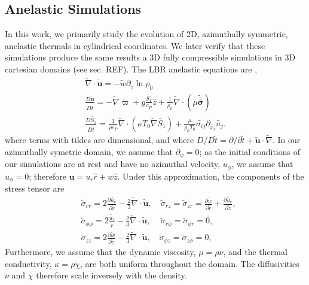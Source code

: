 \documentclass[twocolumn, amsmath, amsfonts, amssymb, trackchanges]{aastex62}
\newcommand{\td}[1]{\ensuremath{\widetilde{#1}}}
\newcommand{\grad}{\ensuremath{\nabla}}
\newcommand{\lilstressT}{\ensuremath{\bm{\bar{\bar{\sigma}}}}}
\begin{document}
\subsection{Anelastic Simulations}
In this work, we primarily study the evolution of 2D, azimuthally symmetric, anelastic
thermals in cylindrical coordinates. 
We later verify that these simulations produce the same results a 3D fully compressible
simulations in 3D cartesian domains (see sec. REF). 
The LBR anelastic equations are \citep{lecoanet&all2014},
\begin{gather}
\td{\grad}\cdot\td{\bm{u}} = -\td{w}\partial_{\tilde{z}} \ln\rho_0 
\label{eqn:AN_continuity_full}\\
\frac{D \td{\bm{u}}}{D \td{t}} = -\td{\grad} \td{\varpi} + g\frac{\td{S_1}}{c_P}\hat{z} + \frac{1}{\rho_0}\td{\grad}\cdot\left(\mu\td{\lilstressT}\right)
\label{eqn:AN_momentum_full}\\
\frac{D \td{S_1}}{D\td{t}} = \frac{1}{\rho c_P}\td{\grad}\cdot\left(\kappa T_0 \td{\grad} \td{S_1}\right) + \frac{\mu}{\rho_0 T_0}\td{\sigma_{ij}}\partial_{\td{x_i}}\td{u_j}
\label{eqn:AN_energy_full}.
\end{gather}
where terms with tildes are dimensional, and where
$D/D\td{t} = \partial/\partial \td{t} + \td{\bm{u}}\cdot\td{\grad}$. In our azimuthally symetric
domain, we assume that $\partial_\phi = 0$; as the initial conditions of our simulations are at rest and have
no azimuthal velocity, $u_\phi$, we assume that $u_\phi = 0$; therefore $\bm{u} = u_r \hat{r} + w\hat{z}$. 
Under this approximation, the components of the stress tensor are
\begin{equation}
\begin{split}
&\td{\sigma}_{rr} = 2\frac{\partial \td{u_r}}{\partial \td{r}} - \frac{2}{3}\td{\grad}\cdot\td{\bm{u}},\,\,\,\,\,\,
\td{\sigma}_{rz}     = \td{\sigma}_{zr} = \frac{\partial \td{w}}{\partial \td{r}} + \frac{\partial \td{u_r}}{\partial \td{z}}, \\
&\td{\sigma}_{\phi\phi} = 2\frac{\td{u_r}}{\td{r}} - \frac{2}{3}\td{\grad}\cdot\td{\bm{u}},\,\,\,\,\,\,\,
\td{\sigma}_{r\phi}  = \td{\sigma}_{\phi r}  = 0, \\
&\td{\sigma}_{zz}       = 2\frac{\partial \td{w}}{\partial \td{z}} - \frac{2}{3}\td{\grad}\cdot\td{\bm{u}}, \,\,\,\,\,\,
\td{\sigma}_{\phi z} = \td{\sigma}_{z \phi}  = 0,\qquad
\end{split}
\end{equation}
Furthermore, we assume that the dynamic viscosity, $\mu = \rho \nu$, and the
thermal conductivity, $\kappa = \rho \chi$, are both uniform throughout the domain.
The diffusivities
$\nu$ and $\chi$ therefore scale inversely with the density.
\end{document}
